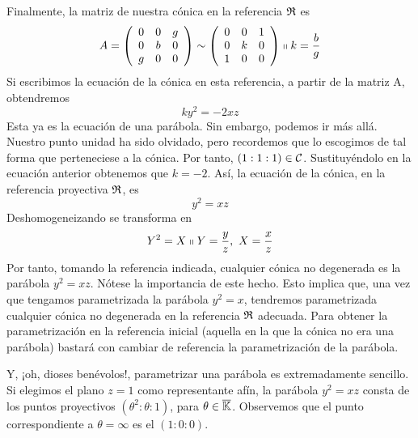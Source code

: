 Finalmente, la matriz de nuestra cónica en la referencia $\mathfrak{R}$ es
\begin{equation*}
	A=\left( \begin{array}{ccc}
		0 & 0 & g\\
		0 & b & 0\\
		g & 0 & 0
	\end{array}\right) \sim 
	\left( \begin{array}{ccc}
		0 & 0 & 1\\
		0 & k & 0\\
		1 & 0 & 0
	\end{array}\right) \shortparallel k=\frac{b}{g}
\end{equation*}
Si escribimos la ecuación de la cónica en esta referencia, a partir de la matriz A, obtendremos
\begin{equation*}
	ky^2=-2xz
\end{equation*}
Esta ya es la ecuación de una parábola. Sin embargo, podemos ir más allá. Nuestro punto unidad ha sido olvidado, pero recordemos que lo escogimos de tal forma que perteneciese a la cónica. Por tanto, $(1:1:1)\in \mathcal{C}$. Sustituyéndolo en la ecuación anterior obtenemos que $k=-2$. Así, la ecuación de la cónica, en la referencia proyectiva $\mathfrak{R}$, es
\begin{equation}
	y^2=xz
\end{equation}
Deshomogeneizando se transforma en 
\begin{equation}
	Y^2=X \shortparallel Y=\frac{y}{z}, \ X=\frac{x}{z}
\end{equation}
Por tanto, tomando la referencia indicada, cualquier cónica no degenerada es la parábola $y^2=xz$. Nótese la importancia de este hecho. Esto implica que, una vez que tengamos parametrizada la parábola $y^2=x$, tendremos parametrizada cualquier cónica no degenerada en la referencia $\mathfrak{R}$ adecuada. Para obtener la parametrización en la referencia inicial (aquella en la que la cónica no era una parábola) bastará con cambiar de referencia la parametrización de la parábola.

Y, ¡oh, dioses benévolos!, parametrizar una parábola es extremadamente sencillo. Si elegimos el plano $z=1$ como representante afín, la parábola $y^2=xz$ consta de los puntos proyectivos $(\theta^2:\theta:1)$, para $\theta\in \overline{\mathbb{K}}$. Observemos que el punto correspondiente a $\theta=\infty$ es el $(1:0:0)$.

